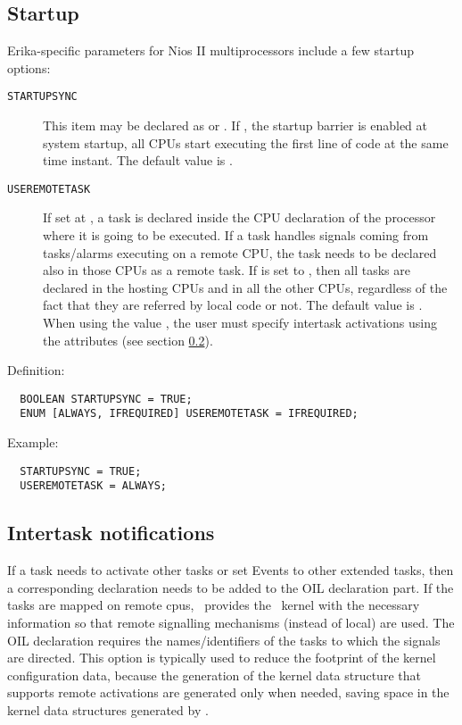 \subsection{Startup}
\label{sec:startup}

Erika-specific parameters for Nios II multiprocessors include a few
startup options:

\begin{description}
\item [{\tt STARTUPSYNC}] This item may be declared as  or
  . If , the startup barrier is enabled at
  system startup, all CPUs start executing the first line of code at
  the same time instant. The default value is .

\item [{\tt USEREMOTETASK}] If set at , a task is
  declared inside the CPU declaration of the processor where it is
  going to be executed. If a task handles signals coming from
  tasks/alarms executing on a remote CPU, the task needs to be
  declared also in those CPUs as a remote task. If
   is set to , then all tasks are
  declared in the hosting CPUs and in all the other CPUs, regardless
  of the fact that they are referred by local code or not. The default
  value is . When using the value
  , the user must specify intertask activations
  using the  attributes (see section
  \ref{sec:intertask-notifications}). 
\end{description}

Definition:

\begin{lstlisting}
  BOOLEAN STARTUPSYNC = TRUE;
  ENUM [ALWAYS, IFREQUIRED] USEREMOTETASK = IFREQUIRED; 
\end{lstlisting}

Example:

\begin{lstlisting}
  STARTUPSYNC = TRUE;
  USEREMOTETASK = ALWAYS;
\end{lstlisting}


\subsection{Intertask notifications}
\label{sec:intertask-notifications}
If a task needs to activate other tasks or set Events to other
extended tasks, then a corresponding declaration needs to be added to
the OIL declaration part. If the tasks are mapped on remote cpus,
\rtd\ provides the \ee\ kernel with the necessary information so that
remote signalling mechanisms (instead of local) are used. The OIL
declaration requires the names/identifiers of the tasks to which the
signals are directed. This option is typically used to reduce the
footprint of the kernel configuration data, because the generation of
the kernel data structure that supports remote activations are
generated only when needed, saving space in the kernel data structures
generated by \rtd.

